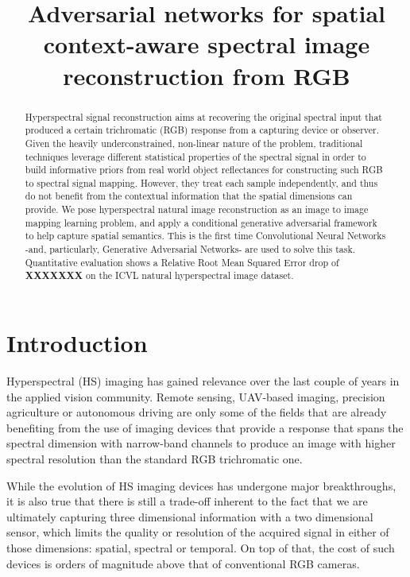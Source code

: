 \documentclass{bmvc2k}
\title{Adversarial networks for spatial context-aware spectral image reconstruction from RGB}
\begin{document}
\maketitle

\begin{abstract}

Hyperspectral signal reconstruction aims at recovering the original spectral input that produced a certain trichromatic (RGB) response from a capturing device or observer.
Given the heavily underconstrained, non-linear nature of the problem, traditional techniques leverage different statistical properties of the spectral signal in order to build informative priors from real world object reflectances for constructing such RGB to spectral signal mapping.
However, they treat each sample independently, and thus do not benefit from the contextual information that the spatial dimensions can provide. 
We pose hyperspectral natural image reconstruction as an image to image mapping learning problem, and apply a conditional generative adversarial framework to help capture spatial semantics. 
This is the first time Convolutional Neural Networks -and, particularly, Generative Adversarial Networks- are used to solve this task. Quantitative evaluation shows a Relative Root Mean Squared Error drop of \textbf{XXXXXXX} on the ICVL natural hyperspectral image dataset.

\end{abstract}


\section{Introduction}
\label{sec:intro}

Hyperspectral (HS) imaging has gained relevance over the last couple of years in the applied vision community. 
Remote sensing, UAV-based imaging, precision agriculture or autonomous driving are only some of the fields that are already benefiting from the use of imaging devices that provide a response that spans the spectral dimension with narrow-band channels to produce an image with higher spectral resolution than the standard RGB trichromatic one.

While the evolution of HS imaging devices has undergone major breakthroughs, it is also true that there is still a trade-off inherent to the fact that we are ultimately capturing three dimensional information with a two dimensional sensor, which limits the quality or resolution of the acquired signal in either of those dimensions: spatial, spectral or temporal. 
On top of that, the cost of such devices is orders of magnitude above that of conventional RGB cameras.
\end{document}

